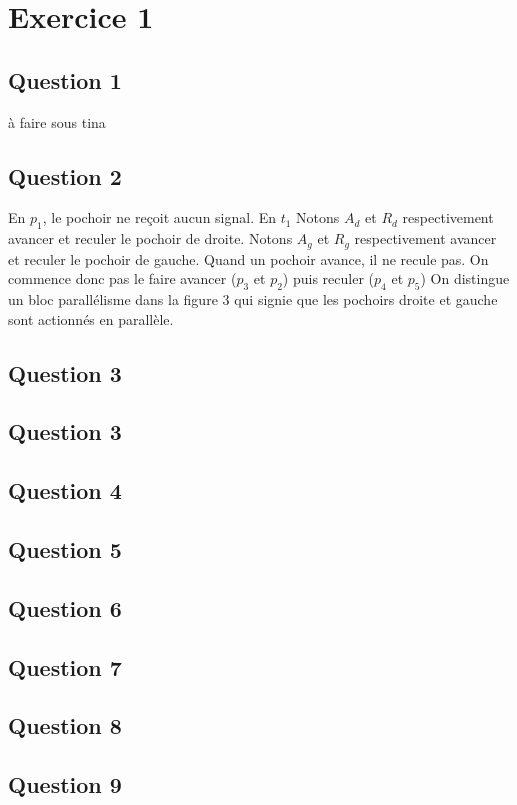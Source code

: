 \section{Exercice 1}
\subsection{Question 1}
à faire sous tina
\subsection{Question 2}
En $p_1$, le pochoir ne reçoit aucun signal.
En $t_1$
Notons $A_d$ et $R_d$ respectivement avancer et reculer le pochoir de
droite.
Notons $A_g$ et $R_g$ respectivement avancer et reculer le pochoir de gauche.
Quand un pochoir avance, il ne recule pas.
On commence donc pas le faire avancer ($p_3$ et $p_2$) puis reculer ($p_4$ et $p_5$)
On distingue un bloc parallélisme dans la figure 3 qui signie que les
pochoirs droite et gauche sont actionnés en parallèle.

\subsection{Question 3}

\subsection{Question 3}

\subsection{Question 4}

\subsection{Question 5}

\subsection{Question 6}

\subsection{Question 7}

\subsection{Question 8}

\subsection{Question 9}

